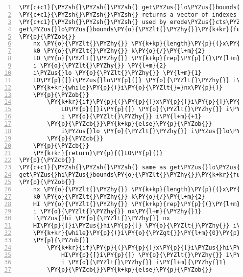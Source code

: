 \begin{Verbatim}[commandchars=\\\{\},codes={\catcode`\$=3\catcode`\^=7\catcode`\_=8},gobble=0,numbers=left,fontfamily=fvm,fontshape=n,fontsize=\footnotesize,tabsize=2]
\PY{c+c1}{\PYZsh{}\PYZsh{}\PYZsh{} get\PYZus{}lo\PYZus{}bounds() gets the index values of x[i]\PYZhy{}k/2 for x[i], $i=1,2,...,n_x$.}
\PY{c+c1}{\PYZsh{}\PYZsh{}\PYZsh{} returns a vector of indexes length $n_x$}
\PY{c+c1}{\PYZsh{}\PYZsh{}\PYZsh{} used by erode\PYZus{}cts\PYZus{}slow()}
get\PYZus{}lo\PYZus{}bounds\PY{o}{\PYZlt{}\PYZhy{}}\PY{k+kr}{function}\PY{p}{(}x\PY{p}{,}k\PY{p}{)}
\PY{p}{\PYZob{}}
	nx \PY{o}{\PYZlt{}\PYZhy{}} \PY{k+kp}{length}\PY{p}{(}x\PY{p}{)}
	k0 \PY{o}{\PYZlt{}\PYZhy{}} k\PY{o}{/}\PY{l+m}{2}
	LO \PY{o}{\PYZlt{}\PYZhy{}} \PY{k+kp}{rep}\PY{p}{(}\PY{l+m}{0}\PY{p}{,}nx\PY{p}{)}
	i \PY{o}{\PYZlt{}\PYZhy{}} \PY{l+m}{2}
	i\PYZus{}lo \PY{o}{\PYZlt{}\PYZhy{}} \PY{l+m}{1}
	LO\PY{p}{[}i\PYZus{}lo\PY{p}{]} \PY{o}{\PYZlt{}\PYZhy{}} i\PYZus{}lo \PY{c+c1}{\PYZsh{} x[1] has lower bound 1}
	\PY{k+kr}{while}\PY{p}{(}i\PY{o}{\PYZlt{}=}nx\PY{p}{)}
	\PY{p}{\PYZob{}}
		\PY{k+kr}{if}\PY{p}{(}\PY{p}{(}x\PY{p}{[}i\PY{p}{]}\PY{o}{\PYZhy{}}x\PY{p}{[}i\PYZus{}lo\PY{p}{]}\PY{p}{)}\PY{o}{\PYZlt{}=}k0\PY{p}{)}\PY{p}{\PYZob{}}
			LO\PY{p}{[}i\PY{p}{]} \PY{o}{\PYZlt{}\PYZhy{}} i\PYZus{}lo
			i \PY{o}{\PYZlt{}\PYZhy{}} i\PY{l+m}{+1}
		\PY{p}{\PYZcb{}}\PY{k+kp}{else}\PY{p}{\PYZob{}}
			i\PYZus{}lo \PY{o}{\PYZlt{}\PYZhy{}} i\PYZus{}lo\PY{l+m}{+1} 
		\PY{p}{\PYZcb{}}
	\PY{p}{\PYZcb{}}
	\PY{k+kr}{return}\PY{p}{(}LO\PY{p}{)}
\PY{p}{\PYZcb{}}
\PY{c+c1}{\PYZsh{}\PYZsh{}\PYZsh{} same as get\PYZus{}lo\PYZus{}bounds() but for x[i]+k/2}
get\PYZus{}hi\PYZus{}bounds\PY{o}{\PYZlt{}\PYZhy{}}\PY{k+kr}{function}\PY{p}{(}x\PY{p}{,}k\PY{p}{)}
\PY{p}{\PYZob{}}
	nx \PY{o}{\PYZlt{}\PYZhy{}} \PY{k+kp}{length}\PY{p}{(}x\PY{p}{)}
	k0 \PY{o}{\PYZlt{}\PYZhy{}} k\PY{o}{/}\PY{l+m}{2}
	HI \PY{o}{\PYZlt{}\PYZhy{}} \PY{k+kp}{rep}\PY{p}{(}\PY{l+m}{0}\PY{p}{,}nx\PY{p}{)}
	i \PY{o}{\PYZlt{}\PYZhy{}} nx\PY{l+m}{\PYZhy{}1}
	i\PYZus{}hi \PY{o}{\PYZlt{}\PYZhy{}} nx
	HI\PY{p}{[}i\PYZus{}hi\PY{p}{]} \PY{o}{\PYZlt{}\PYZhy{}} i\PYZus{}hi \PY{c+c1}{\PYZsh{} x[nx] has upper bound nx}
	\PY{k+kr}{while}\PY{p}{(}i\PY{o}{\PYZgt{}}\PY{l+m}{0}\PY{p}{)}
	\PY{p}{\PYZob{}}
		\PY{k+kr}{if}\PY{p}{(}\PY{p}{(}x\PY{p}{[}i\PYZus{}hi\PY{p}{]}\PY{o}{\PYZhy{}}x\PY{p}{[}i\PY{p}{]}\PY{p}{)}\PY{o}{\PYZlt{}=}k0\PY{p}{)}\PY{p}{\PYZob{}}
			HI\PY{p}{[}i\PY{p}{]} \PY{o}{\PYZlt{}\PYZhy{}} i\PYZus{}hi
			i \PY{o}{\PYZlt{}\PYZhy{}} i\PY{l+m}{\PYZhy{}1}
		\PY{p}{\PYZcb{}}\PY{k+kp}{else}\PY{p}{\PYZob{}}

\end{Verbatim}
